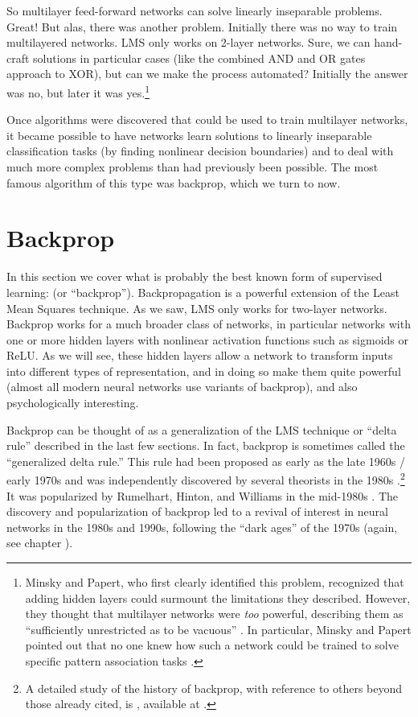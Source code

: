 So multilayer feed-forward networks can solve linearly inseparable problems. Great! But alas, there was another problem. Initially there was no way to train multilayered networks. LMS only works on 2-layer networks. Sure, we can hand-craft solutions in particular cases (like the combined AND and OR gates approach to XOR), but can we make the process automated? Initially the answer was no, but later it was yes.\footnote{Minsky and Papert, who first clearly identified this problem, recognized that adding hidden layers could surmount the limitations they described. However, they thought that multilayer networks were {\em too} powerful, describing them as ``sufficiently unrestricted as to be vacuous'' \cite[p.~112]{rumelhart1986parallel}. In particular, Minsky and Papert pointed out that no one knew how such a network could be trained to solve specific pattern association tasks \cite{minsky1969perceptrons}.}

Once algorithms were discovered that could be used to train multilayer networks, it became possible to have networks learn solutions to linearly inseparable classification tasks (by finding nonlinear decision boundaries) and to deal with much more complex problems than had previously been possible. The most famous algorithm of this type was backprop, which we turn to now.

\section{Backprop}\label{backprop}

In this section we cover what is probably the best known form of supervised learning:  (or ``backprop''). Backpropagation is a powerful extension of the Least Mean Squares technique. As we saw, LMS only works for two-layer networks. Backprop works for a much broader class of networks, in particular networks with one or more hidden layers with nonlinear activation functions such as sigmoids or ReLU. As we will see, these hidden layers allow a network to transform inputs into different types of representation, and in doing so make them quite powerful (almost all modern neural networks use variants of backprop), and also psychologically interesting.

Backprop can be thought of as a generalization of the LMS technique or ``delta rule'' described in the last few sections. In fact, backprop is sometimes called the ``generalized delta rule.'' This rule had been proposed as early as the late 1960s / early 1970s \cite{bryson1969applied, werbos1974beyond} and was independently discovered by several theorists in the 1980s \cite{le1986learning, parker1985learning}.\footnote{A detailed study of the history of backprop, with reference to others beyond those already cited, is \cite{schmidhuber2020deep}, available at .} It was popularized by Rumelhart, Hinton, and Williams in the mid-1980s \cite{rumelhart1986parallel}. The discovery and popularization of backprop led to a revival of interest in neural networks in the 1980s and 1990s, following the ``dark ages'' of the 1970s (again, see chapter ).

